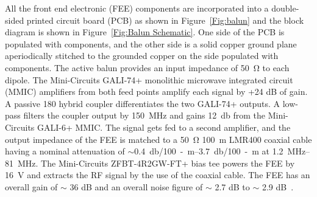 All the front end electronic (FEE) components are incorporated into a double-sided printed circuit board (PCB) as shown in Figure~\ref{Fig:balun} and the block diagram is shown in Figure~\ref{Fig:Balun Schematic}. One side of the PCB is populated with components, and the other side is a solid copper ground plane aperiodically stitched to the grounded copper on the side populated with components. The active balun provides an input impedance of \SI{50}{\ohm} to each dipole. The Mini-Circuits GALI-74+ monolithic microwave integrated circuit (MMIC) amplifiers from both feed points amplify each signal by +24 dB of gain. A passive {180\degree} hybrid coupler differentiates the two GALI-74+ outputs. A low-pass filters the coupler output by \SI{150}{\mega\hertz} and gains \SI{12}{\decibel} from the Mini-Circuits GALI-6+ MMIC. The signal gets fed to a second amplifier, and the output impedance of the FEE is matched to a \SI{50}{\ohm} \SI{100}{\meter} LMR400 coaxial cable having a nominal attenuation of $\sim$\SIrange{0.4}{3.7}{\decibel/100-m} at \SIrange{1.2}{81}{\mega\hertz}. The Mini-Circuits ZFBT-4R2GW-FT+ bias tee powers the FEE by \SI{16}{\volt} and extracts the RF signal by the use of the coaxial cable. The FEE has an overall gain of $\sim$ 36 dB and an overall noise figure of $\sim$ 2.7 dB to $\sim$ 2.9 dB~\citep{Memo35, 2012PASP..124.1090H}.

